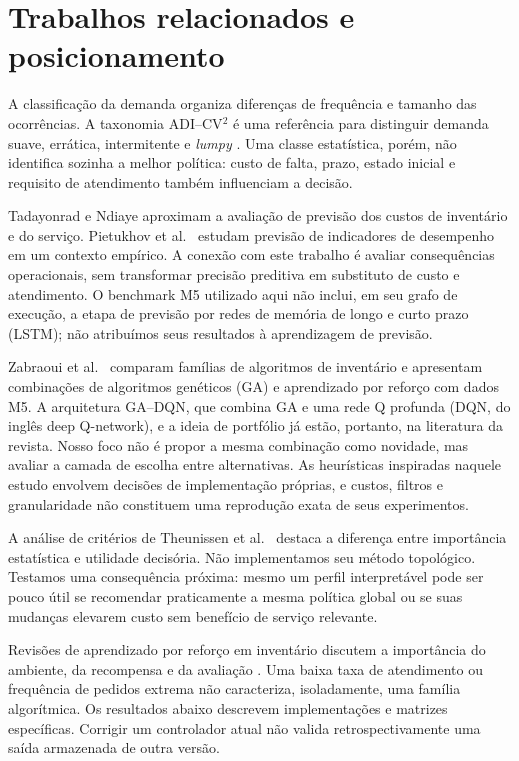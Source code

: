 \documentclass[preprint,12pt]{elsarticle}
\begin{document}
\section{Trabalhos relacionados e posicionamento}
A classificação da demanda organiza diferenças de frequência e tamanho das ocorrências. A taxonomia ADI--CV$^2$ é uma referência para distinguir demanda suave, errática, intermitente e \textit{lumpy} \cite{syntetos2005}. Uma classe estatística, porém, não identifica sozinha a melhor política: custo de falta, prazo, estado inicial e requisito de atendimento também influenciam a decisão.

Tadayonrad e Ndiaye \cite{sca_f81ad2b3e023} aproximam a avaliação de previsão dos custos de inventário e do serviço. Pietukhov et al.\ \cite{sca_92a549559870} estudam previsão de indicadores de desempenho em um contexto empírico. A conexão com este trabalho é avaliar consequências operacionais, sem transformar precisão preditiva em substituto de custo e atendimento. O benchmark M5 utilizado aqui não inclui, em seu grafo de execução, a etapa de previsão por redes de memória de longo e curto prazo (LSTM); não atribuímos seus resultados à aprendizagem de previsão.

Zabraoui et al.\ \cite{sca_27e994c54848} comparam famílias de algoritmos de inventário e apresentam combinações de algoritmos genéticos (GA) e aprendizado por reforço com dados M5. A arquitetura GA--DQN, que combina GA e uma rede Q profunda (DQN, do inglês deep Q-network), e a ideia de portfólio já estão, portanto, na literatura da revista. Nosso foco não é propor a mesma combinação como novidade, mas avaliar a camada de escolha entre alternativas. As heurísticas inspiradas naquele estudo envolvem decisões de implementação próprias, e custos, filtros e granularidade não constituem uma reprodução exata de seus experimentos.

A análise de critérios de Theunissen et al.\ \cite{sca_c5c06dcbc9e5} destaca a diferença entre importância estatística e utilidade decisória. Não implementamos seu método topológico. Testamos uma consequência próxima: mesmo um perfil interpretável pode ser pouco útil se recomendar praticamente a mesma política global ou se suas mudanças elevarem custo sem benefício de serviço relevante.

Revisões de aprendizado por reforço em inventário discutem a importância do ambiente, da recompensa e da avaliação \cite{Boute2022DRLInventoryRoadmap}. Uma baixa taxa de atendimento ou frequência de pedidos extrema não caracteriza, isoladamente, uma família algorítmica. Os resultados abaixo descrevem implementações e matrizes específicas. Corrigir um controlador atual não valida retrospectivamente uma saída armazenada de outra versão.
\end{document}
